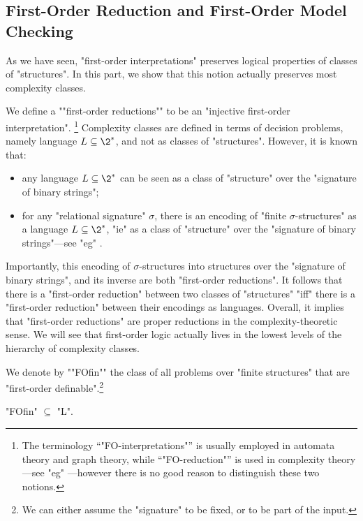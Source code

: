 \subsection{First-Order Reduction and First-Order Model Checking}

As we have seen, "first-order interpretations" preserves logical properties of classes
of "structures". In this part, we show that this notion actually preserves most complexity classes.

We define a \AP""first-order reductions"" to be an "injective first-order interpretation".%
\footnote{The terminology ``"FO-interpretations"'' is usually employed in automata theory and graph theory, while ``"FO-reduction"'' is used in complexity theory---see "eg" \cite[Definition 2.11 \& Definition 1.26]{Immerman1998DescriptiveComplexity}---however there is no good reason to
distinguish these two notions.}
Complexity classes are defined in terms of decision problems, namely 
language $L \subseteq \2^*$, and not as classes of "structures". 
However, it is known that:
\begin{itemize}
	\item any language $L \subseteq \2^*$
		can be seen as a class of "structure" over the "signature of binary strings";
	\item for any "relational signature" $\sigma$,
		there is an encoding of "finite $\sigma$-structures" as a language
		$L \subseteq \2^*$, "ie" as a class of "structure" over the "signature of binary strings"---see "eg" \cite[\S~2.2]{Immerman1998DescriptiveComplexity}.
\end{itemize}
Importantly, this encoding of $\sigma$-structures into structures over
the "signature of binary strings", and its inverse are both "first-order reductions".
It follows that there is a "first-order reduction" between two classes of "structures"
"iff" there is a "first-order reduction" between their encodings as languages.
Overall, it implies that "first-order reductions" are proper reductions in the complexity-theoretic 
sense. We will see that first-order logic actually lives in the lowest levels of the hierarchy of 
complexity classes.

We denote by \AP""FOfin"" the class of all problems over "finite structures" that are "first-order definable".\footnote{We can either assume the "signature" to be fixed, or to be part of the input.}

\begin{proposition}[Folklore]
	\label{prop:FO-in-L}
	"FOfin" $\subseteq$ "L".
\end{proposition}

